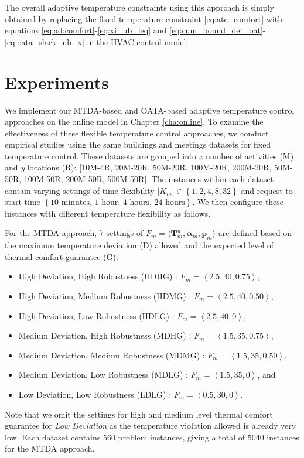 The overall adaptive temperature constraints using this approach is simply obtained by replacing the fixed temperature constraint \eqref{eq:atc_comfort} with equations \eqref{eq:ad:comfort}-\eqref{eq:xi_ub_leq} and \eqref{eq:cum_bound_det_oat}-\eqref{eq:oata_slack_ub_x} in the HVAC control model.


\section{Experiments} \label{sec:atc_exp}

We implement our MTDA-based and OATA-based adaptive temperature control approaches on the online model in Chapter \ref{cha:online}. To examine the effectiveness of these flexible temperature control approaches, we conduct empirical studies using the same buildings and meetings datasets for fixed temperature control. %
These datasets are grouped into \textsl{x} number of activities (M) and \textsl{y} locations (R): [10M-4R, 20M-20R, 50M-20R, 100M-20R, 200M-20R, 50M-50R, 100M-50R, 200M-50R, 500M-50R]. 
The instances within each dataset contain varying settings of time flexibility $\left|K_m\right| \in \left\{1,2,4,8,32\right\}$ and request-to-start time $\left\{\mbox{10 minutes, 1 hour, 4 hours, 24 hours}\right\}$.
We then configure these instances with different temperature flexibility as follows.

For the MTDA approach, 7 settings of $F_m=\langle {\bm T}^{u}_m, {\bm \alpha}_m, {\bm p}_m\rangle$ are defined based on the maximum temperature deviation (D) allowed and the expected level of thermal comfort guarantee (G):
\begin{itemize}	
	\item High Deviation, High Robustness (HDHG) : $F_m=\left\langle 2.5, 40, 0.75\right\rangle$,
	\item High Deviation, Medium Robustness (HDMG) : $F_m=\left\langle 2.5, 40, 0.50\right\rangle$,
	\item High Deviation, Low Robustness (HDLG) : $F_m=\left\langle 2.5, 40, 0\right\rangle$,
	\item Medium Deviation, High Robustness (MDHG) : $F_m=\left\langle 1.5, 35, 0.75\right\rangle$,
	\item Medium Deviation, Medium Robustness (MDMG) : $F_m=\left\langle 1.5, 35, 0.50\right\rangle$,
	\item Medium Deviation, Low Robustness (MDLG) : $F_m=\left\langle 1.5, 35, 0\right\rangle$, and
	\item Low Deviation, Low Robustness (LDLG) : $F_m=\left\langle 0.5, 30, 0\right\rangle$.	
\end{itemize}
Note that we omit the settings for high and medium level thermal comfort guarantee for \textsl{Low Deviation} as the temperature violation allowed is already very low. Each dataset contains 560 problem instances, giving a total of 5040 instances for the MTDA approach.

